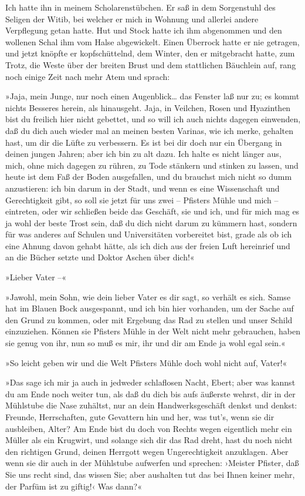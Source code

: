 Ich hatte ihn in meinem Scholarenstübchen. Er saß in dem
Sorgenstuhl des Seligen der Witib, bei welcher er mich in Wohnung
und allerlei andere Verpflegung getan hatte. Hut und Stock hatte
ich ihm abgenommen und den wollenen Schal ihm vom Halse
abgewickelt. Einen Überrock hatte er nie getragen, und jetzt
knöpfte er kopfschüttelnd, dem Winter, den er mitgebracht hatte,
zum Trotz, die Weste über der breiten Brust und dem stattlichen
Bäuchlein auf, rang noch einige Zeit nach mehr Atem und sprach:

»Jaja, mein Junge, nur noch einen Augenblick\ldots{} das Fenster laß nur
zu; es kommt nichts Besseres herein, als hinausgeht. Jaja, in
Veilchen, Rosen und Hyazinthen bist du freilich hier nicht
gebettet, und so will ich auch nichts dagegen einwenden, daß du
dich auch wieder mal an meinen besten Varinas, wie ich merke,
gehalten hast, um dir die Lüfte zu verbessern. Es ist bei dir doch
nur ein Übergang in deinen jungen Jahren; aber ich bin zu alt dazu.
Ich halte es nicht länger aus, mich, ohne mich dagegen zu rühren,
zu Tode stänkern und stinken zu lassen, und heute ist dem Faß der
Boden ausgefallen, und du brauchst mich nicht so dumm anzustieren:
ich bin darum in der Stadt, und wenn es eine Wissenschaft und
Gerechtigkeit gibt, so soll sie jetzt für uns zwei – Pfisters Mühle
und mich – eintreten, oder wir schließen beide das Geschäft, sie
und ich, und für mich mag es ja wohl der beste Trost sein, daß du
dich nicht darum zu kümmern hast, sondern für was anderes auf
Schulen und Universitäten vorbereitet bist, grade als ob ich eine
Ahnung davon gehabt hätte, als ich dich aus der freien Luft
hereinrief und an die Bücher setzte und Doktor Aschen über dich!«

»Lieber Vater –«

»Jawohl, mein Sohn, wie dein lieber Vater es dir sagt, so verhält
es sich. Samse hat im Blauen Bock ausgespannt, und ich bin hier
vorhanden, um der Sache auf den Grund zu kommen, oder mit Ergebung
das Rad zu stellen und unser Schild einzuziehen. Können sie
Pfisters Mühle in der Welt nicht mehr gebrauchen, haben sie genug
von ihr, nun so muß es mir, ihr und dir am Ende ja wohl egal
sein.«

»So leicht geben wir und die Welt Pfisters Mühle doch wohl nicht
auf, Vater!«

»Das sage ich mir ja auch in jedweder schlaflosen Nacht, Ebert;
aber was kannst du am Ende noch weiter tun, als daß du dich bis
aufs äußerste wehrst, dir in der Mühlstube die Nase zuhältst, nur
an dein Handwerksgeschäft denkst und denkst: Freunde, Herrschaften,
gute Gevattern hin und her, was tut's, wenn sie dir ausbleiben,
Alter? Am Ende bist du doch von Rechts wegen eigentlich mehr ein
Müller als ein Krugwirt, und solange sich dir das Rad dreht, hast
du noch nicht den richtigen Grund, deinen Herrgott wegen
Ungerechtigkeit anzuklagen. Aber wenn sie dir auch in der Mühlstube
aufwerfen und sprechen: ›Meister Pfister, daß Sie uns recht sind,
das wissen Sie; aber aushalten tut das bei Ihnen keiner mehr, der
Parfüm ist zu giftig!‹ Was dann?«

